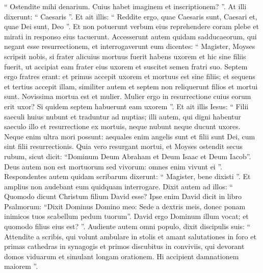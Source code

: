 \begin{biblechapter}
\begin{biblechapter}
\begin{biblechapter}
\begin{biblechapter}
\begin{biblechapter}
\begin{biblechapter}
\begin{biblechapter}
\begin{biblechapter}
\begin{biblechapter}
\begin{biblechapter}
\begin{biblechapter}
\begin{biblechapter}
\begin{biblechapter}
\begin{biblechapter}
\begin{biblechapter}
\begin{biblechapter}
\begin{biblechapter}
\begin{biblechapter}
\begin{biblechapter}
\begin{biblechapter}
\verse “ Ostendite mihi denarium. Cuius habet imaginem et inscriptionem? ”. 
 \verse At illi dixerunt: “ Caesaris ”. Et ait illis: “ Reddite ergo, quae Caesaris sunt, Caesari et, quae Dei sunt, Deo ”. 
\verse Et non potuerunt verbum eius reprehendere coram plebe et mirati in responso eius tacuerunt.
 \verse Accesserunt autem quidam sadducaeorum, qui negant esse resurrectionem, et interrogaverunt eum 
\verse dicentes: “ Magister, Moyses scripsit nobis, si frater alicuius mortuus fuerit habens uxorem et hic sine filiis fuerit, ut accipiat eam frater eius uxorem et suscitet semen fratri suo. 
\verse Septem ergo fratres erant: et primus accepit uxorem et mortuus est sine filiis; 
\verse et sequens 
\verse et tertius accepit illam, similiter autem et septem non reliquerunt filios et mortui sunt. 
\verse Novissima mortua est et mulier. 
\verse Mulier ergo in resurrectione cuius eorum erit uxor? Si quidem septem habuerunt eam uxorem ”. 
\verse Et ait illis Iesus: “ Filii saeculi huius nubunt et traduntur ad nuptias; 
\verse illi autem, qui digni habentur saeculo illo et resurrectione ex mortuis, neque nubunt neque ducunt uxores. 
\verse Neque enim ultra mori possunt: aequales enim angelis sunt et filii sunt Dei, cum sint filii resurrectionis. 
\verse Quia vero resurgant mortui, et Moyses ostendit secus rubum, sicut dicit: “Dominum Deum Abraham et Deum Isaac et Deum Iacob”. 
\verse Deus autem non est mortuorum sed vivorum: omnes enim vivunt ei ”. 
\verse Respondentes autem quidam scribarum dixerunt: “ Magister, bene dixisti ”. 
\verse Et amplius non audebant eum quidquam interrogare.
 \verse Dixit autem ad illos: “ Quomodo dicunt Christum filium David esse? 
\verse Ipse enim David dicit in libro Psalmorum:
 “Dixit Dominus Domino meo: Sede a dextris meis,
 \verse donec ponam inimicos tuos scabellum pedum tuorum”.
 \verse David ergo Dominum illum vocat; et quomodo filius eius est? ”.
 \verse Audiente autem omni populo, dixit discipulis suis: 
\verse “ Attendite a scribis, qui volunt ambulare in stolis et amant salutationes in foro et primas cathedras in synagogis et primos discubitus in conviviis, 
\verse qui devorant domos viduarum et simulant longam orationem. Hi accipient damnationem maiorem ”.
 

\end{biblechapter}
\end{biblechapter}
\end{biblechapter}
\end{biblechapter}
\end{biblechapter}
\end{biblechapter}
\end{biblechapter}
\end{biblechapter}
\end{biblechapter}
\end{biblechapter}
\end{biblechapter}
\end{biblechapter}
\end{biblechapter}
\end{biblechapter}
\end{biblechapter}
\end{biblechapter}
\end{biblechapter}
\end{biblechapter}
\end{biblechapter}
\end{biblechapter}

